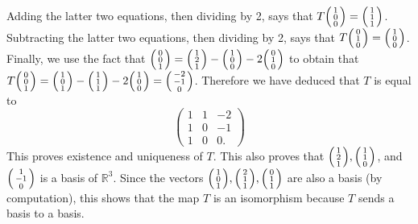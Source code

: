 \documentclass[11pt,oneside]{amsart}
\theoremstyle{definition}
\newcommand{\bR}{\mathbb{R}}
\newcommand*\colvec[1]{\begin{psmallmatrix}#1\end{psmallmatrix}}
\begin{document}
    \begin{solution}
        Adding the latter two equations, then dividing by 2, says that $T\colvec{1\\0\\0}=\colvec{1\\1\\1}$. Subtracting the latter two equations, then dividing by 2, says that $T\colvec{0\\1\\0}=\colvec{1\\0\\0}$. Finally, we use the fact that $\colvec{0\\0\\1}=\colvec{1\\2\\1}-\colvec{1\\0\\0}-2\colvec{0\\1\\0}$ to obtain that $T\colvec{0\\0\\1}=\colvec{1\\0\\1}-\colvec{1\\1\\1}-2\colvec{1\\0\\0}=\colvec{-2\\-1\\0}$. Therefore we have deduced that $T$ is equal to
        \[\begin{pmatrix}
            1&1&-2\\1&0&-1\\1&0&0.
        \end{pmatrix}\]
        This proves existence and uniqueness of $T$. This also proves that $\colvec{1\\2\\1},\colvec{1\\1\\0}$, and $\colvec{1\\-1\\0}$ is a basis of $\bR^3$. Since the vectors $\colvec{1\\0\\1},\colvec{2\\1\\1},\colvec{0\\1\\1}$ are also a basis (by computation), this shows that the map $T$ is an isomorphism because $T$ sends a basis to a basis.
    \end{solution}
\end{document}

